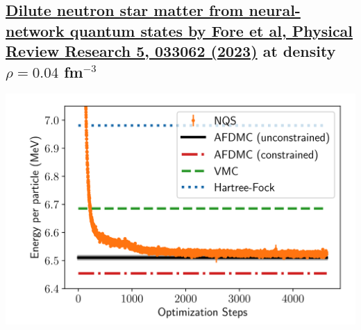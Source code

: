 \documentclass[%
oneside,                 %
final,                   %
10pt]{article}
\begin{document}
\vspace{6mm}

\subsection{\href{{https://journals.aps.org/prresearch/pdf/10.1103/PhysRevResearch.5.033062}}{Dilute neutron star matter from neural-network quantum states by Fore et al, Physical Review Research 5, 033062 (2023)} at density $\rho=0.04$ fm$^{-3}$}

\begin{block}{}

\vspace{6mm}

\centerline{\includegraphics[width=0.9\linewidth]{figures/nmatter.png}}

\vspace{6mm}

\end{block}

\end{document}
